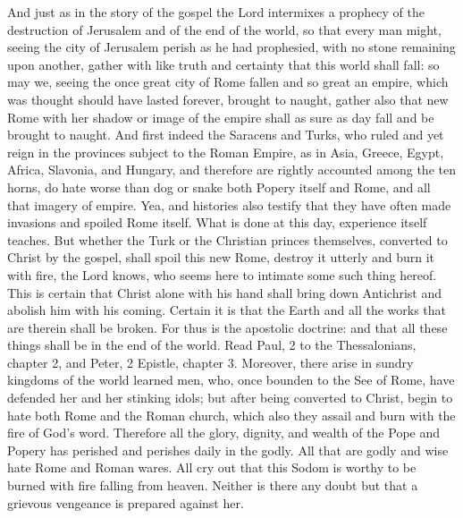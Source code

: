 And just as in the story of the gospel the Lord intermixes a prophecy of the destruction of Jerusalem and of the end of the world, so that every man might, seeing the city of Jerusalem perish as he had prophesied, with no stone remaining upon another, gather with like truth and certainty that this world shall fall: so may we, seeing the once great city of Rome fallen and so great an empire, which was thought should have lasted forever, brought to naught, gather also that new Rome with her shadow or image of the empire shall as sure as day fall and be brought to naught. And first indeed the Saracens and Turks, who ruled and yet reign in the provinces subject to the Roman Empire, as in Asia, Greece, Egypt, Africa, Slavonia, and Hungary, and therefore are rightly accounted among the ten horns, do hate worse than dog or snake both Popery itself and Rome, and all that imagery of empire. Yea, and histories also testify that they have often made invasions and spoiled Rome itself. What is done at this day, experience itself teaches. But whether the Turk or the Christian princes themselves, converted to Christ by the gospel, shall spoil this new Rome, destroy it utterly and burn it with fire, the Lord knows, who seems here to intimate some such thing hereof. This is certain that Christ alone with his hand shall bring down Antichrist and abolish him with his coming. Certain it is that the Earth and all the works that are therein shall be broken. For thus is the apostolic doctrine: and that all these things shall be in the end of the world. Read Paul, 2 to the Thessalonians, chapter 2, and Peter, 2 Epistle, chapter 3. Moreover, there arise in sundry kingdoms of the world learned men, who, once bounden to the See of Rome, have defended her and her stinking idols; but after being converted to Christ, begin to hate both Rome and the Roman church, which also they assail and burn with the fire of God’s word. Therefore all the glory, dignity, and wealth of the Pope and Popery has perished and perishes daily in the godly. All that are godly and wise hate Rome and Roman wares. All cry out that this Sodom is worthy to be burned with fire falling from heaven. Neither is there any doubt but that a grievous vengeance is prepared against her.

